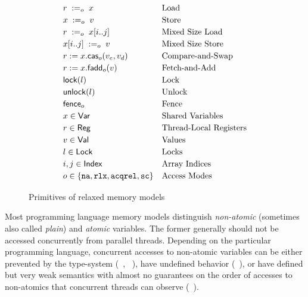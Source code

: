 \begin{figure}[t]
\[\def\arraystretch{1.2}
  \begin{array}{ll} 
    \readInst{o}{r}{x}                  & \text{Load}                   \\ 
    \writeInst{o}{x}{v}                 & \text{Store}                  \\ 
    \readArrayInst{o}{r}{x}{i}{j}       & \text{Mixed Size Load}        \\ 
    \writeArrayInst{o}{x}{v}{i}{j}      & \text{Mixed Size Store}       \\ 
    \casInst{o}{r}{x}{v_e}{v_d}         & \text{Compare-and-Swap}        \\ 
    \faddInst{o}{r}{x}{v}               & \text{Fetch-and-Add}          \\ 
    \lockInst{l}                        & \text{Lock}                   \\ 
    \unlockInst{l}                      & \text{Unlock}                 \\ 
    \fenceInst{o}                       & \text{Fence}                  \\ 
    x \in \mathsf{Var}                  & \text{Shared Variables}       \\ 
    r \in \mathsf{Reg}                  & \text{Thread-Local Registers} \\ 
    v \in \mathsf{Val}                  & \text{Values}                 \\ 
    l \in \mathsf{Lock}                 & \text{Locks}                  \\ 
    i,j \in \mathsf{Index}              & \text{Array Indices}          \\ 
    o \in \set{\na,\rlx,\acqrel,\sco}   & \text{Access Modes}           \\ 
  \end{array}
\]
\caption{Primitives of relaxed memory models}
\label{fig:wmm-abs}
\end{figure}

Most programming language memory models distinguish 
\emph{non-atomic} (sometimes also called \emph{plain})
and \emph{atomic} variables. 
The former generally should not be accessed 
concurrently from parallel threads. 
Depending on the particular programming language, 
concurrent accesses to non-atomic variables 
can be either prevented by the type-system 
(\eg \Haskell~\cite{Marlow-al:Haskell10, Vollmer-al:PPoPP17}, \Rust~\cite{RustBook:19}), 
have undefined behavior (\eg \CPP~\cite{Boehm-Adve:PLDI08, Batty-al:POPL11}), 
or have defined but very weak semantics with almost 
no guarantees on the order of accesses to non-atomics
that concurrent threads can observe (\eg \Java~\cite{Manson-al:POPL05}).

